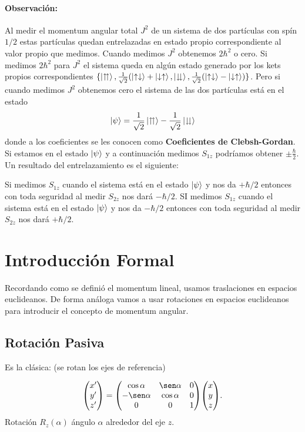 \paragraph{Observación: }
Al medir el momentum angular total $J^2$ de un sistema de dos partículas con spín $1/2$ estas partículas quedan entrelazadas en estado propio correspondiente al valor propio que medimos. Cuando medimos $J^2$ obtenemos $2\hbar ^2$ o cero. Si medimos $2\hbar ^2$ para $J^2$ el sistema queda en algún estado generado por los kets propios correspondientes $\{ \ket{\upuparrows}, \frac{1}{\sqrt{2}} (\ket{\uparrow \downarrow} + \ket{\downarrow \uparrow}, \ket{\downdownarrows}, \frac{1}{\sqrt{2}} (\ket{\uparrow \downarrow} - \ket{\downarrow \uparrow}) \}$. Pero si cuando medimos $J^2$ obtenemos cero el sistema de las dos partículas está en el estado 
	$$ \ket{\psi} = \frac{1}{\sqrt{2}} \ket{\upuparrows} - \frac{1}{\sqrt{2}} \ket{\downdownarrows} $$
donde a los coeficientes se les conocen como \textbf{Coeficientes de Clebsh-Gordan}. Si estamos en el estado $\ket{\psi}$ y a continuación medimos $S_{1z}$ podríamos obtener $\pm \frac{\hbar}{2}$. Un resultado del entrelazamiento es el siguiente:




\begin{tcolorbox}
	Si medimos $S_{1z}$ cuando el sistema está en el estado $\ket{\psi}$ y nos da $+\hbar /2$ entonces con toda seguridad al medir $S_{2z}$ nos dará $-\hbar /2$. SI medimos $S_{1z}$ cuando el sistema está en el estado $\ket{\psi}$ y nos da $-\hbar /2$ entonces con toda seguridad al medir $S_{2z}$ nos dará $+\hbar /2$.
\end{tcolorbox}


\section{Introducción Formal}
Recordando como se definió el momentum lineal, usamos traslaciones en espacios euclideanos. De forma análoga vamos a usar rotaciones en espacios euclideanos para introducir el concepto de momentum angular.


\subsection{Rotación Pasiva}
 Es la clásica: (se rotan los ejes de referencia)

$$ \mqty(x' \\ y' \\ z') = \mqty(\cos \alpha & \sen \alpha & 0 \\ -\sen \alpha & \cos \alpha & 0 \\ 0 & 0 & 1) \mqty(x \\ y \\ z). $$
Rotación $R_z (\alpha)$ ángulo $\alpha$ alrededor del eje $z$.

